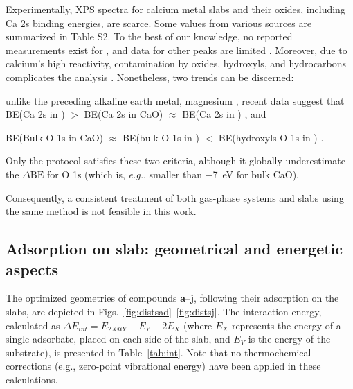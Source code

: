 \documentclass[journal=jpccck,manuscript=article]{achemso}
\def\dbe{\ensuremath{\Delta\text{BE}}}
\begin{document}
Experimentally, XPS spectra for calcium metal slabs and their oxides, including Ca 2s binding energies, are scarce. Some values from various sources are summarized in Table S2. To the best of our knowledge, no reported measurements exist for , and data for other peaks are limited \cite{franzenXPSSpectraCrystalline1977,sveinbjornssonIonicConductivityFormation2014}. Moreover, due to calcium's high reactivity, contamination by oxides, hydroxyls, and hydrocarbons complicates the analysis \cite{dupinSystematicXPSStudies2000,bebenseeAdsorptionOxygenWater2008,fujimoriInteractionWaterCaO2016a,cristXPSLibraryWebsite2021a}. Nonetheless, two trends can be discerned: \begin{inparaenum}[(i)]
	\item unlike the preceding alkaline earth metal, magnesium \cite{dobrovolskyXPSStudyInfluence2017}, recent data suggest that BE(Ca 2s in ) $>$ BE(Ca 2s in CaO) $\approx$ BE(Ca 2s in ) \cite{ochsCO2ChemisorptionCa1998,cristHandbookMonochromaticXPS2000a,cristXPSLibraryWebsite2021a}, and 
	\item BE(Bulk O 1s in CaO) $\approx$ BE(bulk O 1s in ) $<$ BE(hydroxyls O 1s in ) \cite{dupinSystematicXPSStudies2000,bebenseeAdsorptionOxygenWater2008,fujimoriInteractionWaterCaO2016a,cristXPSLibraryWebsite2021a}.
\end{inparaenum}
Only the  protocol satisfies these two criteria, although it globally underestimate the \dbe{} for O 1s (which is, \textit{e.g.}, smaller than \SI{-7}{\electronvolt} for bulk CaO\cite{cristXPSLibraryWebsite2021a}).

Consequently, a consistent treatment of both gas-phase systems and slabs using the same method is not feasible in this work.


\clearpage

\subsection{Adsorption on slab: geometrical and energetic aspects}

The optimized geometries of compounds \textbf{a}–\textbf{j}, following their adsorption on the slabs, are depicted in Figs.~\ref{fig:distsad}–\ref{fig:distsj}. The interaction energy, calculated as $\Delta E_{int} = E_{2X@Y} - E_Y - 2E_X$ (where $E_X$ represents the energy of a single adsorbate, placed on each side of the slab, and $E_Y$ is the energy of the substrate), is presented in Table~\ref{tab:int}. Note that no thermochemical corrections (e.g., zero-point vibrational energy) have been applied in these calculations.
\end{document}
